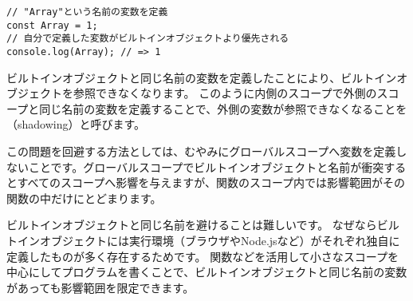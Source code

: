 \begin{lstlisting}
// "Array"という名前の変数を定義
const Array = 1;
// 自分で定義した変数がビルトインオブジェクトより優先される
console.log(Array); // => 1
\end{lstlisting}

ビルトインオブジェクトと同じ名前の変数を定義したことにより、ビルトインオブジェクトを参照できなくなります。
このように内側のスコープで外側のスコープと同じ名前の変数を定義することで、外側の変数が参照できなくなることを\textbf{}（shadowing）と呼びます。

この問題を回避する方法としては、むやみにグローバルスコープへ変数を定義しないことです。グローバルスコープでビルトインオブジェクトと名前が衝突するとすべてのスコープへ影響を与えますが、関数のスコープ内では影響範囲がその関数の中だけにとどまります。

ビルトインオブジェクトと同じ名前を避けることは難しいです。
なぜならビルトインオブジェクトには実行環境（ブラウザやNode.jsなど）がそれぞれ独自に定義したものが多く存在するためです。
関数などを活用して小さなスコープを中心にしてプログラムを書くことで、ビルトインオブジェクトと同じ名前の変数があっても影響範囲を限定できます。

